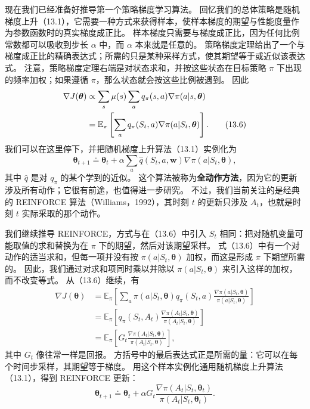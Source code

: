 \documentclass[UTF8, 12pt, fontset=fandol, oneside]{ctexart}
\begin{document}
现在我们已经准备好推导第一个策略梯度学习算法。
回忆我们的总体策略是随机梯度上升（13.1），它需要一种方式来获得样本，使样本梯度的期望与性能度量作为参数函数时的真实梯度成正比。
样本梯度只需要与梯度成正比，因为任何比例常数都可以吸收到步长 $\alpha$ 中，而 $\alpha$ 本来就是任意的。
策略梯度定理给出了一个与梯度成正比的精确表达式；所需的只是某种采样方式，使其期望等于或近似该表达式。
注意，策略梯度定理右端是对状态求和，并按这些状态在目标策略 $\pi$ 下出现的频率加权；如果遵循 $\pi$，那么状态就会按这些比例被遇到。
因此
\begin{align}
\nabla J(\boldsymbol{\theta})
&\propto \sum_s \mu(s)\sum_a q_\pi(s,a)\nabla\pi(a|s,\boldsymbol{\theta})\notag\\
&=\mathbb{E}_\pi\left[\sum_a q_\pi(S_t,a)\nabla\pi(a|S_t,\boldsymbol{\theta})\right].
\tag{13.6}
\end{align}
我们可以在这里停下，并把随机梯度上升算法（13.1）实例化为
\begin{equation}
\boldsymbol{\theta}_{t+1}\doteq \boldsymbol{\theta}_t+\alpha\sum_a \hat q(S_t,a,\mathbf{w})\nabla\pi(a|S_t,\boldsymbol{\theta}),
\tag{13.7}
\end{equation}
其中 $\hat q$ 是对 $q_\pi$ 的某个学到的近似。
这个算法被称为\textbf{全动作方法}，因为它的更新涉及所有动作；它很有前途，也值得进一步研究。
不过，我们当前关注的是经典的 REINFORCE 算法（Williams，1992），其时刻 $t$ 的更新只涉及 $A_t$，也就是时刻 $t$ 实际采取的那个动作。

我们继续推导 REINFORCE，方式与在（13.6）中引入 $S_t$ 相同：把对随机变量可能取值的求和替换为在 $\pi$ 下的期望，然后对该期望采样。
式（13.6）中有一个对动作的适当求和，但每一项并没有按 $\pi(a|S_t,\boldsymbol{\theta})$ 加权，而这是形成 $\pi$ 下期望所需的。
因此，我们通过对求和项同时乘以并除以 $\pi(a|S_t,\boldsymbol{\theta})$ 来引入这样的加权，而不改变等式。
从（13.6）继续，有
\begin{align*}
\nabla J(\boldsymbol{\theta})
&=\mathbb{E}_\pi\left[\sum_a \pi(a|S_t,\boldsymbol{\theta})q_\pi(S_t,a)
\frac{\nabla\pi(a|S_t,\boldsymbol{\theta})}{\pi(a|S_t,\boldsymbol{\theta})}\right]\\
&=\mathbb{E}_\pi\left[q_\pi(S_t,A_t)
\frac{\nabla\pi(A_t|S_t,\boldsymbol{\theta})}{\pi(A_t|S_t,\boldsymbol{\theta})}\right]\\
&=\mathbb{E}_\pi\left[G_t
\frac{\nabla\pi(A_t|S_t,\boldsymbol{\theta})}{\pi(A_t|S_t,\boldsymbol{\theta})}\right],
\end{align*}
其中 $G_t$ 像往常一样是回报。
方括号中的最后表达式正是所需的量：它可以在每个时间步采样，其期望等于梯度。
用这个样本实例化通用随机梯度上升算法（13.1），得到 REINFORCE 更新：
\begin{equation}
\boldsymbol{\theta}_{t+1}\doteq \boldsymbol{\theta}_t+\alpha G_t
\frac{\nabla\pi(A_t|S_t,\boldsymbol{\theta}_t)}{\pi(A_t|S_t,\boldsymbol{\theta}_t)}.
\tag{13.8}
\end{equation}
\end{document}

